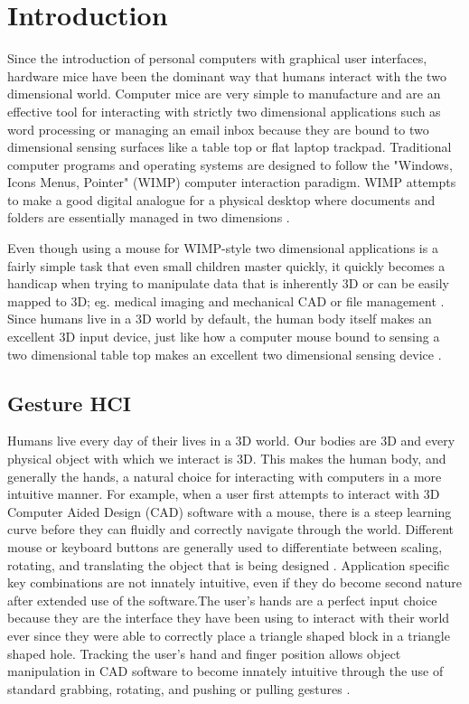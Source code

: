 \chapter{Introduction}

Since the introduction of personal computers with graphical user interfaces, hardware mice have been the dominant way that humans interact with the two dimensional world. Computer mice are very simple to manufacture and are an effective tool for interacting with strictly two dimensional applications such as word processing or managing an email inbox because they are bound to two dimensional sensing surfaces like a table top or flat laptop trackpad. Traditional computer programs and operating systems are designed to follow the "Windows, Icons Menus, Pointer" (WIMP) computer interaction paradigm. WIMP attempts to make a good digital analogue for a physical desktop where documents and folders are essentially managed in two dimensions \cite{hinckley2002input}.

Even though using a mouse for WIMP-style two dimensional applications is a fairly simple task that even small children master quickly, it quickly becomes a handicap when trying to manipulate data that is inherently 3D or can be easily mapped to 3D; eg. medical imaging and mechanical CAD or file management \cite{krueger1991artificial}. Since humans live in a 3D world by default, the human body itself makes an excellent 3D input device, just like how a computer mouse bound to sensing a two dimensional table top makes an excellent two dimensional sensing device \cite{wren1996pfinder}.

\section{Gesture HCI}

Humans live every day of their lives in a 3D world. Our bodies are 3D and every physical object with which we interact is 3D. This makes the human body, and generally the hands, a natural choice for interacting with computers in a more intuitive manner. For example, when a user first attempts to interact with 3D Computer Aided Design (CAD) software with a mouse, there is a steep learning curve before they can fluidly and correctly navigate through the world. Different mouse or keyboard buttons are generally used to differentiate between scaling, rotating, and translating the object that is being designed \cite{hamade2007evaluating}. Application specific key combinations are not innately intuitive, even if they do become second nature after extended use of the software.The user's hands are a perfect input choice because they are the interface they have been using to interact with their world ever since they were able to correctly place a triangle shaped block in a triangle shaped hole. Tracking the user's hand and finger position allows object manipulation in CAD software to become innately intuitive through the use of standard grabbing, rotating, and pushing or pulling gestures \cite{nam1996recognition}.

